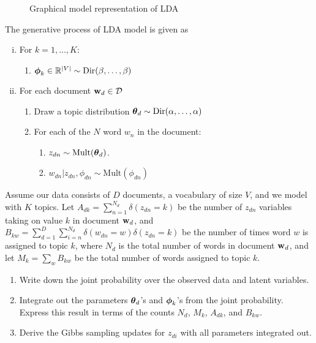 \documentclass{amsmlaj}
\begin{document}
\begin{problem}
\begin{figure}[H]
\begin{center}
\caption{Graphical model representation of LDA}
\label{fig:lda}
\end{center}
\end{figure}
The generative process of  LDA model is given as
\begin{enumerate}[(i)]
\item For $k=1,\dotsc,K$:
	\begin{enumerate}
	\item $\bm{\mathbf{\phi}}_k \in {\mathbb R}^{|V|} \sim \text{Dir}(\beta,\dotsc,\beta)$
	\end{enumerate}
\item For each document $\bm{\mathbf{w}}_d \in \mathcal{D}$
\begin{enumerate}
	\item Draw a topic distribution $\bm{\mathbf{\theta}}_d \sim \text{Dir}(\alpha,\dotsc,\alpha)$
	\item For each of the $N$ word $w_n$ in the document:
		\begin{enumerate}
		\item $z_{dn} \sim \text{Mult}(\bm{\mathbf{\theta}}_d)$.
		\item $w_{dn}|z_{dn},\phi_{dn} \sim \text{Mult}(\phi_{dn})$
		\end{enumerate}
\end{enumerate}
\end{enumerate}
Assume our data consists of $D$ documents, a vocabulary of size $V$, and we model with $K$ topics. Let $A_{dk}=\sum\limits_{n=1}^{N_d}\delta(z_{dn}=k)$ be the number of $z_{dn}$ variables taking on value $k$ in document $\bm{\mathbf{w}}_d$, and $B_{kw}=\sum\limits_{d=1}^D\sum\limits_{i=n}^{N_d}\delta(w_{dn}=w)\delta(z_{dn}=k)$ be the number of times word $w$ is assigned to topic $k$, where $N_d$ is the total number of words in document $\bm{\mathbf{w}}_d$, and let $M_k=\sum\limits_{w}B_{kw}$ be the total number of words assigned to topic $k$.
\begin{enumerate}
\item Write down the joint probability over the observed data and latent variables.
\item Integrate out the parameters $\bm{\mathbf{\theta}}_d$'s and $\bm{\mathbf{\phi}}_k$'s from the joint probability. Express this result in terms of the counts $N_d$, $M_k$, $A_{dk}$, and $B_{kw}$.
\item Derive the Gibbs sampling updates for $z_{di}$ with all parameters integrated out.
\end{enumerate}
\end{problem}
\end{document}
